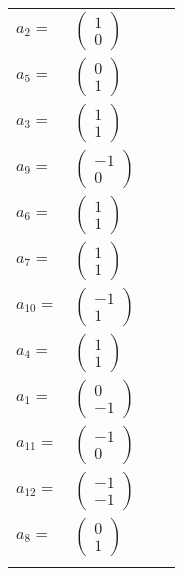 \documentclass[1p]{elsarticle_modified}
\theoremstyle{definition}
\begin{document}
\begin{tabular}{m{7pt} m{180pt} m{7pt} m{180pt} }
\flushright $a_{2}=$&$\begin{pmatrix}1\\0\end{pmatrix}$ \\
\flushright $a_{5}=$&$\begin{pmatrix}0\\1\end{pmatrix}$ \\
\flushright $a_{3}=$&$\begin{pmatrix}1\\1\end{pmatrix}$ \\
\flushright $a_{9}=$&$\begin{pmatrix}-1\\0\end{pmatrix}$ \\
\flushright $a_{6}=$&$\begin{pmatrix}1\\1\end{pmatrix}$ \\
\flushright $a_{7}=$&$\begin{pmatrix}1\\1\end{pmatrix}$ \\
\flushright $a_{10}=$&$\begin{pmatrix}-1\\1\end{pmatrix}$ \\
\flushright $a_{4}=$&$\begin{pmatrix}1\\1\end{pmatrix}$ \\
\flushright $a_{1}=$&$\begin{pmatrix}0\\-1\end{pmatrix}$ \\
\flushright $a_{11}=$&$\begin{pmatrix}-1\\0\end{pmatrix}$ \\
\flushright $a_{12}=$&$\begin{pmatrix}-1\\-1\end{pmatrix}$ \\
\flushright $a_{8}=$&$\begin{pmatrix}0\\1\end{pmatrix}$\\&\end{tabular}
\end{document}
